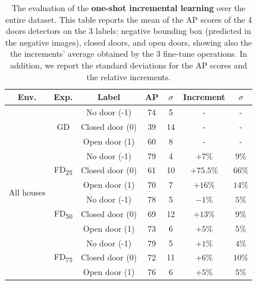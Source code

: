 \begin{table}[h!]
	\centering
	\begin{tabular}{ccccccc}
		
		\toprule
		\textbf{Env.} & \textbf{Exp.} & \textbf{Label} & \textbf{AP} & \textbf{$\sigma$} & \textbf{Increment} &  \textbf{$\sigma$} \\
		\midrule
		\multicolumn{1}{c|}{\multirow{12}{*}{All houses}} & \multicolumn{1}{c|}{\multirow{3}{*}{\textsf{GD}}} & No door (-1) & 74 & 5 & - & - \tabularnewline 
		\multicolumn{1}{c|}{}& \multicolumn{1}{c|}{} & Closed door (0) & 39 & 14 & - & -  \\
		\multicolumn{1}{c|}{}& \multicolumn{1}{c|}{}& Open door (1) & 60 & 8 & - & -  \\  \cline{2-7}
		\multicolumn{1}{c|}{}& \multicolumn{1}{c|}{\multirow{3}{*}{\textsf{FD\textsubscript{25}}}} & No door (-1) & 79 & 4 & $+7\%$ & $9\%$ \tabularnewline [1pt]
		\multicolumn{1}{c|}{}& \multicolumn{1}{c|}{} & Closed door (0) & 61 & 10 &  $+75.5\%$ & $66\%$  \\ 
		\multicolumn{1}{c|}{}& \multicolumn{1}{c|}{} & Open door (1) & 70 & 7 & $+16\%$ & $14\%$  \\ \cline{2-7}
		\multicolumn{1}{c|}{} & \multicolumn{1}{c|}{\multirow{3}{*}{\textsf{FD\textsubscript{50}}}} & No door (-1) & 78 & 5 & $-1\%$ & $5\%$  \tabularnewline 
		\multicolumn{1}{c|}{}& \multicolumn{1}{c|}{} & Closed door (0) & 69 & 12 & $+13\%$ & $9\%$ \\
		\multicolumn{1}{c|}{}& \multicolumn{1}{c|}{}& Open door (1) & 73 & 6 & $+5\%$ & $5\%$ \\  \cline{2-7}
		\multicolumn{1}{c|}{}& \multicolumn{1}{c|}{\multirow{3}{*}{\textsf{FD\textsubscript{75}}}} & No door (-1) & 79 & 5 & $+1\%$ & $4\%$  \tabularnewline [1pt]
		\multicolumn{1}{c|}{}& \multicolumn{1}{c|}{} & Closed door (0) & 72 & 11 & $+6\%$ & $10\%$  \\ 
		\multicolumn{1}{c|}{}& \multicolumn{1}{c|}{} & Open door (1) & 76 & 6 & $+5\%$ & $5\%$  \\ 
		\bottomrule
	\end{tabular}
	\caption{The evaluation of the \textbf{one-shot incremental learning} over the entire dataset. This table reports the mean of the AP scores of the 4 doors detectors on the 3 labels: negative bounding box (predicted in the negative images), closed doors, and open doors, showing also the  the increments' average obtained by the 3 fine-tune operations. In addition, we report the standard deviations for the AP scores and the relative increments.}
	\label{tab:all_houses_results}
\end{table}

